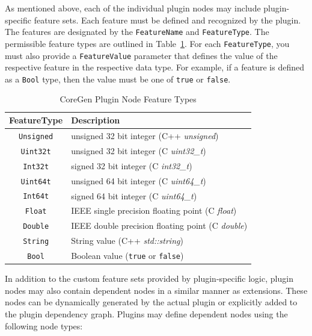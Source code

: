 \documentclass{article}
\begin{document}
As mentioned above, each of the individual plugin nodes may include plugin-specific 
feature sets.  Each feature must be defined and recognized by the plugin.  The features 
are designated by the \texttt{FeatureName} and \texttt{FeatureType}.  The permissible feature types 
are outlined in Table~\ref{tab:PluginFeatureTypes}.  For each \texttt{FeatureType}, you must also 
provide a \texttt{FeatureValue} parameter that defines the value of the respective feature in the 
respective data type.  For example, if a feature is defined as a \texttt{Bool} type, then the value 
must be one of \texttt{true} or \texttt{false}.  

\begin{table}[h]
\begin{center}
\caption{CoreGen Plugin Node Feature Types}
\vspace{0.125in}
\label{tab:PluginFeatureTypes}
\begin{tabular}{|c|l|}
\hline
\textbf{FeatureType} & \textbf{Description}\\
\hline
\texttt{Unsigned} & unsigned 32 bit integer (C++ \textit{unsigned})\\
\hline
\texttt{Uint32t} & unsigned 32 bit integer (C \textit{uint32\_t})\\
\hline
\texttt{Int32t} & signed 32 bit integer (C \textit{int32\_t})\\
\hline
\texttt{Uint64t} & unsigned 64 bit integer (C \textit{uint64\_t})\\
\hline
\texttt{Int64t} & signed 64 bit integer (C \textit{uint64\_t}) \\
\hline
\texttt{Float} & IEEE single precision floating point (C \textit{float})\\
\hline
\texttt{Double} & IEEE double precision floating point (C \textit{double})\\
\hline
\texttt{String} & String value (C++ \textit{std::string})\\
\hline
\texttt{Bool} & Boolean value (\texttt{true} or \texttt{false})\\
\hline
\end{tabular}
\end{center}
\end{table}

In addition to the custom feature sets provided by plugin-specific logic, plugin nodes 
may also contain dependent nodes in a similar manner as extensions.  These nodes can be 
dynamically generated by the actual plugin or explicitly added to the plugin dependency graph.  
Plugins may define dependent nodes using the following node types: 
\end{document}
